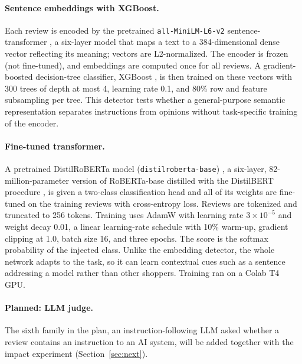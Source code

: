 \documentclass[11pt,a4paper]{article}
\newcommand{\code}[1]{\texttt{#1}}
\begin{document}
\paragraph{Sentence embeddings with XGBoost.} Each review is encoded by the pretrained \code{all-MiniLM-L6-v2} sentence-transformer \citep{sbert,minilm}, a six-layer model that maps a text to a 384-dimensional dense vector reflecting its meaning; vectors are L2-normalized. The encoder is frozen (not fine-tuned), and embeddings are computed once for all reviews. A gradient-boosted decision-tree classifier, XGBoost \citep{xgboost}, is then trained on these vectors with 300 trees of depth at most 4, learning rate 0.1, and 80\% row and feature subsampling per tree. This detector tests whether a general-purpose semantic representation separates instructions from opinions without task-specific training of the encoder.

\paragraph{Fine-tuned transformer.} A pretrained DistilRoBERTa model (\code{distilroberta-base}) \citep{distilroberta_card}, a six-layer, 82-million-parameter version of RoBERTa-base \citep{roberta} distilled with the DistilBERT procedure \citep{distilbert}, is given a two-class classification head and all of its weights are fine-tuned on the training reviews with cross-entropy loss. Reviews are tokenized and truncated to 256 tokens. Training uses AdamW with learning rate $3\times10^{-5}$ and weight decay 0.01, a linear learning-rate schedule with 10\% warm-up, gradient clipping at 1.0, batch size 16, and three epochs. The score is the softmax probability of the injected class. Unlike the embedding detector, the whole network adapts to the task, so it can learn contextual cues such as a sentence addressing a model rather than other shoppers. Training ran on a Colab T4 GPU.

\paragraph{Planned: LLM judge.} The sixth family in the plan, an instruction-following LLM asked whether a review contains an instruction to an AI system, will be added together with the impact experiment (Section~\ref{sec:next}).
\end{document}
